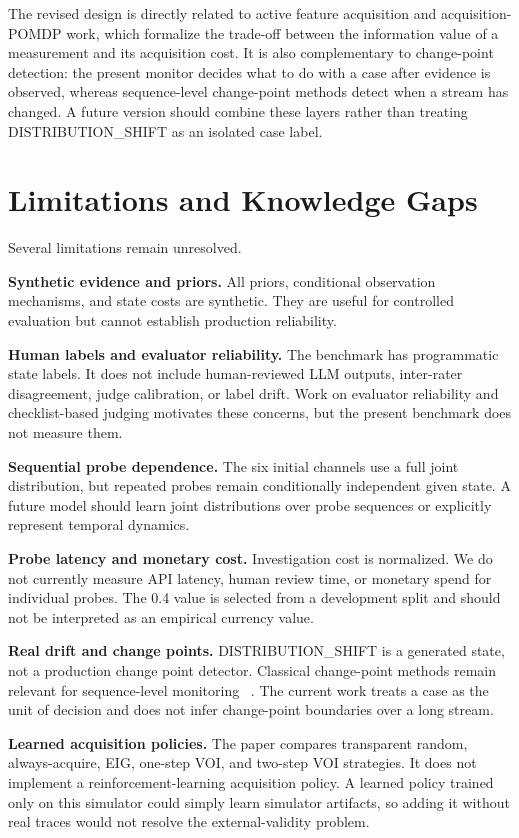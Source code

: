 \documentclass{article}
\begin{document}
The revised design is directly related to active feature acquisition and acquisition-POMDP work, which formalize the trade-off between the information value of a measurement and its acquisition cost. It is also complementary to change-point detection: the present monitor decides what to do with a case after evidence is observed, whereas sequence-level change-point methods detect when a stream has changed. A future version should combine these layers rather than treating DISTRIBUTION\_SHIFT as an isolated case label.

\section{Limitations and Knowledge Gaps}

Several limitations remain unresolved.

\textbf{Synthetic evidence and priors.} All priors, conditional observation mechanisms, and state costs are synthetic. They are useful for controlled evaluation but cannot establish production reliability.

\textbf{Human labels and evaluator reliability.} The benchmark has programmatic state labels. It does not include human-reviewed LLM outputs, inter-rater disagreement, judge calibration, or label drift. Work on evaluator reliability and checklist-based judging motivates these concerns, but the present benchmark does not measure them.

\textbf{Sequential probe dependence.} The six initial channels use a full joint distribution, but repeated probes remain conditionally independent given state. A future model should learn joint distributions over probe sequences or explicitly represent temporal dynamics.

\textbf{Probe latency and monetary cost.} Investigation cost is normalized. We do not currently measure API latency, human review time, or monetary spend for individual probes. The 0.4 value is selected from a development split and should not be interpreted as an empirical currency value.

\textbf{Real drift and change points.} DISTRIBUTION\_SHIFT is a generated state, not a production change point detector. Classical change-point methods remain relevant for sequence-level monitoring ~. The current work treats a case as the unit of decision and does not infer change-point boundaries over a long stream.

\textbf{Learned acquisition policies.} The paper compares transparent random, always-acquire, EIG, one-step VOI, and two-step VOI strategies. It does not implement a reinforcement-learning acquisition policy. A learned policy trained only on this simulator could simply learn simulator artifacts, so adding it without real traces would not resolve the external-validity problem.
\end{document}
